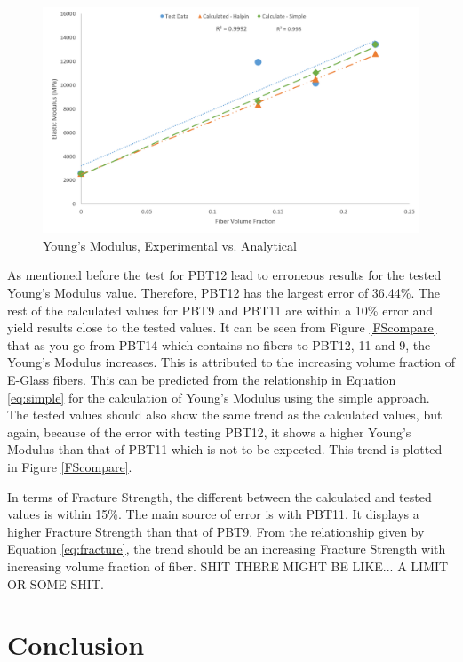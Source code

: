 \documentclass[11pt]{article}
\begin{document}
\begin{figure}[H]
\centering
\includegraphics[width=.95\linewidth]{figures/modulus_test_vs_calc.png}
\caption{Young's Modulus, Experimental vs. Analytical}
\label{ModulusCompare}
\end{figure}

As mentioned before the test for PBT12 lead to erroneous results for the tested Young's Modulus value. Therefore, PBT12 has the largest error of 36.44\%. The rest of the calculated values for PBT9 and PBT11 are within a 10\% error and yield results close to the tested values. It can be seen from Figure \ref{FScompare} that as you go from PBT14 which contains no fibers to PBT12, 11 and  9, the Young's Modulus increases. This is attributed to the increasing volume fraction of E-Glass fibers. This can be predicted from the relationship in Equation \ref{eq:simple} for the calculation of Young's Modulus using the simple approach. The tested values should also show the same trend as the calculated values, but again, because of the error with testing PBT12, it shows a higher Young's Modulus than that of PBT11 which is not to be expected. This trend is plotted in Figure \ref{FScompare}.
\singlespacing

In terms of Fracture Strength, the different between the calculated and tested values is within 15\%. The main source of error is with PBT11. It displays a higher Fracture Strength than that of PBT9. From the relationship given by Equation \ref{eq:fracture}, the trend should be an increasing Fracture Strength with increasing volume fraction of fiber. SHIT THERE MIGHT BE LIKE... A LIMIT OR SOME SHIT.


\section{Conclusion}
\end{document}
